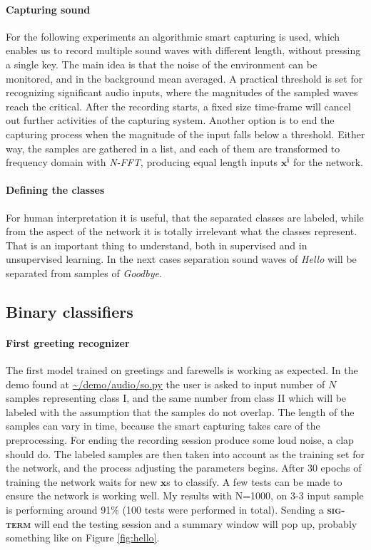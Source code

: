 \paragraph{Capturing sound}
For the following experiments an algorithmic smart capturing is used, which enables us to record multiple sound waves with different length, without pressing a single key. The main idea is that the noise of the environment can be monitored, and in the background mean averaged. A practical threshold is set for recognizing significant audio inputs, where the magnitudes of the sampled waves reach the critical. After the recording starts, a fixed size time-frame will cancel out further activities of the capturing system. Another option is to end the capturing process when the magnitude of the input falls below a threshold. Either way, the samples are gathered in a list, and each of them are transformed to frequency domain with \emph{N-FFT}, producing equal length inputs  $\mathbf{x^i}$ for the network.

\paragraph{Defining the classes}
For human interpretation it is useful, that the separated classes are labeled, while from the aspect of the network it is totally irrelevant what the classes represent. That is an important thing to understand, both in supervised and in unsupervised learning. In the next cases separation sound waves of \emph{Hello} will be separated from samples of \emph{Goodbye}.

\subsection{Binary classifiers}
\paragraph{First greeting recognizer}
The first model trained on greetings and farewells is working as expected. In the demo found at \cite{DV} \url{~/demo/audio/so.py} the user is asked to input number of $N$ samples representing class I, and the same number from class II which will be labeled with the assumption that the samples do not overlap. The length of the samples can vary in time, because the smart capturing takes care of the preprocessing. 
For ending the recording session produce some loud noise, a clap should do. 
The labeled samples are then taken into account as the training set for the network, and the process adjusting the parameters begins. 
After 30 epochs of training the network waits for new $\mathbf{x}$s to classify. 
A few tests can be made to ensure the network is working well. 
My results with N=1000, on 3-3 input sample is performing around 91\% (100 tests were performed in total). 
Sending a \textbf{\textsc{sig-term}} will end the testing session and a summary window will pop up, probably something like on Figure \ref{fig:hello}.

